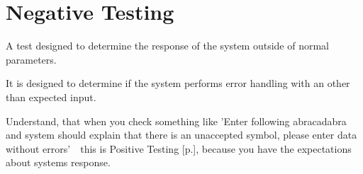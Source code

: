 \section{Negative Testing}
\label{sec:Negative Testing}

A test designed to determine the response of the system outside of normal parameters.

It is designed to determine if the system performs error handling with an other than expected input.

Understand, that when you check something like 'Enter following abracadabra and system should explain that there is an unaccepted symbol, please enter data without errors'~\textemdash~this is Positive Testing [p.\pageref{sec:Positive Testing}], because you have the expectations about systems response.
